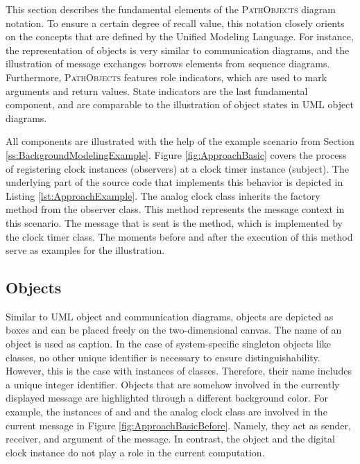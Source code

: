 This section describes the fundamental elements of the \textsc{PathObjects} diagram notation.
To ensure a certain degree of recall value, this notation closely orients on the concepts that are defined by the Unified Modeling Language.
For instance, the representation of objects is very similar to communication diagrams, and the illustration of message exchanges borrows elements from sequence diagrams.
Furthermore, \textsc{PathObjects} features role indicators, which are used to mark arguments and return values.
State indicators are the last fundamental component, and are comparable to the illustration of object states in UML object diagrams.

All components are illustrated with the help of the example scenario from Section \ref{ss:BackgroundModelingExample}.
Figure \ref{fig:ApproachBasic} covers the process of registering clock instances (observers) at a clock timer instance (subject).
The underlying part of the source code that implements this behavior is depicted in Listing \ref{lst:ApproachExample}.
The analog clock class inherits the  factory method from the observer class.
This method represents the message context in this scenario.
The message that is sent is the  method, which is implemented by the clock timer class.
The moments before and after the execution of this method serve as examples for the illustration.

\subsection{Objects}
\label{ss:ApproachNotationObjects}
Similar to UML object and communication diagrams, objects are depicted as boxes and can be placed freely on the two-dimensional canvas.
The name of an object is used as caption.
In the case of system-specific singleton objects like classes, no other unique identifier is necessary to ensure distinguishability.
However, this is the case with instances of classes.
Therefore, their name includes a unique integer identifier.
Objects that are somehow involved in the currently displayed message are highlighted through a different background color.
For example, the instances of  and  and the analog clock class are involved in the current message in Figure \ref{fig:ApproachBasicBefore}.
Namely, they act as sender, receiver, and argument of the  message.
In contrast, the  object and the digital clock instance do not play a role in the current computation.

